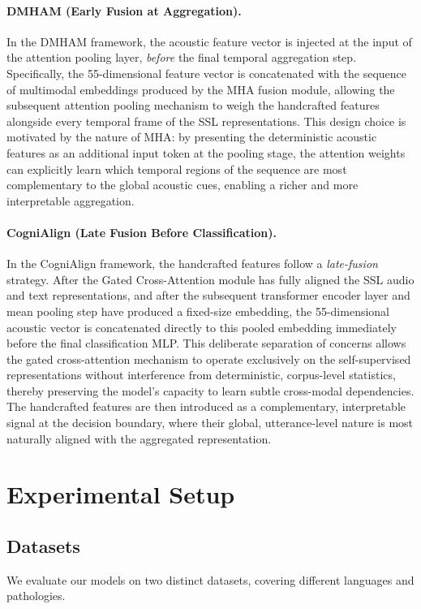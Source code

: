 \documentclass{Odyssey2026}
\begin{document}
\paragraph{DMHAM (Early Fusion at Aggregation).}
In the DMHAM framework, the acoustic feature vector is injected at the input of the attention pooling layer, \textit{before} the final temporal aggregation step. Specifically, the 55-dimensional feature vector is concatenated with the sequence of multimodal embeddings produced by the MHA fusion module, allowing the subsequent attention pooling mechanism to weigh the handcrafted features alongside every temporal frame of the SSL representations. This design choice is motivated by the nature of MHA: by presenting the deterministic acoustic features as an additional input token at the pooling stage, the attention weights can explicitly learn which temporal regions of the sequence are most complementary to the global acoustic cues, enabling a richer and more interpretable aggregation.

\paragraph{CogniAlign (Late Fusion Before Classification).}
In the CogniAlign framework, the handcrafted features follow a \textit{late-fusion} strategy. After the Gated Cross-Attention module has fully aligned the SSL audio and text representations, and after the subsequent transformer encoder layer and mean pooling step have produced a fixed-size embedding, the 55-dimensional acoustic vector is concatenated directly to this pooled embedding immediately before the final classification MLP. This deliberate separation of concerns allows the gated cross-attention mechanism to operate exclusively on the self-supervised representations without interference from deterministic, corpus-level statistics, thereby preserving the model's capacity to learn subtle cross-modal dependencies. The handcrafted features are then introduced as a complementary, interpretable signal at the decision boundary, where their global, utterance-level nature is most naturally aligned with the aggregated representation.

\section{Experimental Setup}

\subsection{Datasets}
We evaluate our models on two distinct datasets, covering different languages and pathologies.
\end{document}
